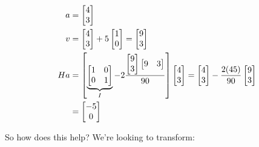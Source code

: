 \begin{align*}
  a &= \begin{bmatrix}
    4 \\ 3
  \end{bmatrix} \\
  v &= \begin{bmatrix}
    4 \\ 3
  \end{bmatrix}
  +
  5 \begin{bmatrix}
    1 \\ 0
  \end{bmatrix}
  =
  \begin{bmatrix}
    9 \\ 3
  \end{bmatrix} \\
  Ha &= \left[
    \underbrace{
      \begin{bmatrix}
        1 & 0 \\ 0 & 1
      \end{bmatrix}
    }_I
    -
    2
    {
      \begin{bmatrix}
        9 \\ 3
      \end{bmatrix}
      \begin{bmatrix}
        9 & 3
      \end{bmatrix}
      \over
      90
    }
  \right]
  \begin{bmatrix}
    4 \\ 3
  \end{bmatrix}
  =
  \begin{bmatrix}
    4 \\ 3
  \end{bmatrix}
  -
  {2(45) \over 90}
  \begin{bmatrix}
    9 \\ 3
  \end{bmatrix} \\
  &= \begin{bmatrix}
    -5 \\ 0
  \end{bmatrix}
\end{align*}

So how does this help? We're looking to transform:

